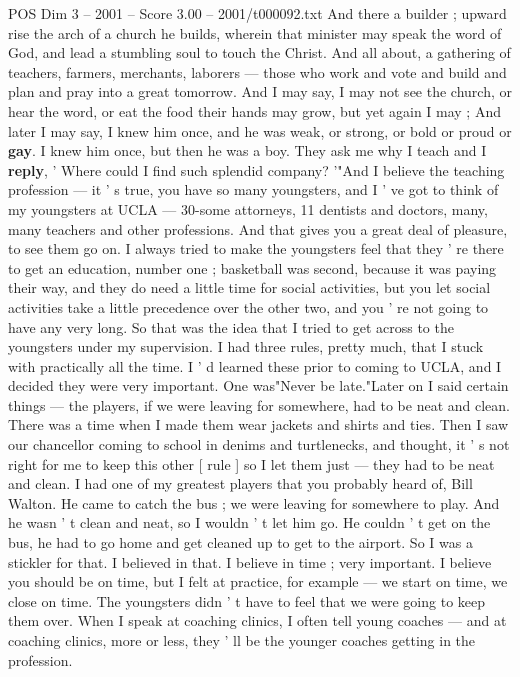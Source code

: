 \begin{textsample}{POS Dim 3 – 2001 – Score 3.00 – 2001/t000092.txt}
And there a builder ; upward rise the arch of a church he builds, wherein that minister may speak the word of God, and lead a stumbling soul to touch the Christ.
And all about, a gathering of teachers, farmers, merchants, laborers — those who work and vote and build and plan and pray into a great tomorrow.
And I may say, I may not see the church, or hear the word, or eat the food their hands may grow, but yet again I may ; And later I may say, I knew him once, and he was weak, or strong, or bold or proud or \textbf{gay}.
I knew him once, but then he was a boy.
They ask me why I teach and I \textbf{reply}, ' Where could I find such splendid company? '"And I believe the teaching profession — it ' s true, you have so many youngsters, and I ' ve got to think of my youngsters at UCLA — 30-some attorneys, 11 dentists and doctors, many, many teachers and other professions.
And that gives you a great deal of pleasure, to see them go on.
I always tried to make the youngsters feel that they ' re there to get an education, number one ; basketball was second, because it was paying their way, and they do need a little time for social activities, but you let social activities take a little precedence over the other two, and you ' re not going to have any very long.
So that was the idea that I tried to get across to the youngsters under my supervision.
I had three rules, pretty much, that I stuck with practically all the time.
I ' d learned these prior to coming to UCLA, and I decided they were very important.
One was"Never be late."Later on I said certain things — the players, if we were leaving for somewhere, had to be neat and clean.
There was a time when I made them wear jackets and shirts and ties.
Then I saw our chancellor coming to school in denims and turtlenecks, and thought, it ' s not right for me to keep this other [ rule ] so I let them just — they had to be neat and clean.
I had one of my greatest players that you probably heard of, Bill Walton.
He came to catch the bus ; we were leaving for somewhere to play.
And he wasn ' t clean and neat, so I wouldn ' t let him go.
He couldn ' t get on the bus, he had to go home and get cleaned up to get to the airport.
So I was a stickler for that.
I believed in that.
I believe in time ; very important.
I believe you should be on time, but I felt at practice, for example — we start on time, we close on time.
The youngsters didn ' t have to feel that we were going to keep them over.
When I speak at coaching clinics, I often tell young coaches — and at coaching clinics, more or less, they ' ll be the younger coaches getting in the profession.

\end{textsample}
